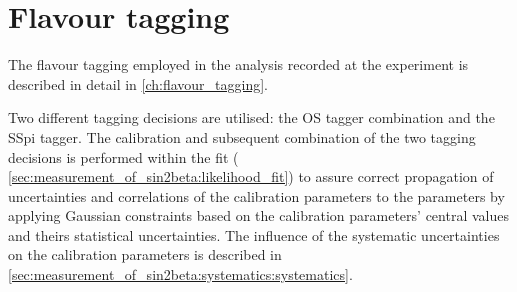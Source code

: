 
\section{Flavour tagging}
\label{sec:measurement_of_sin2beta:flavour_tagging}

The flavour tagging employed in the analysis recorded at the \LHCb experiment is
described in detail in \cref{ch:flavour_tagging}.

Two different tagging decisions are utilised: the \acf{OS} tagger combination
and the \acf{SSpi} tagger. The calibration and subsequent combination of the two
tagging decisions is performed within the fit (\cf
\cref{sec:measurement_of_sin2beta:likelihood_fit}) to assure correct propagation
of uncertainties and correlations of the calibration parameters to the \CP
parameters by applying Gaussian constraints based on the calibration parameters'
central values and theirs statistical uncertainties. The influence of the
systematic uncertainties on the calibration parameters is described in
\cref{sec:measurement_of_sin2beta:systematics:systematics}.

